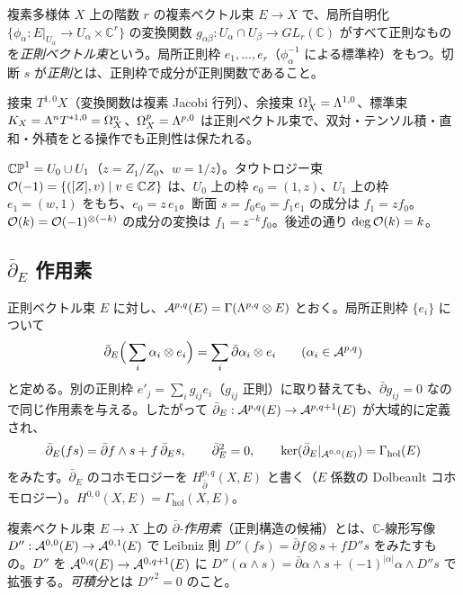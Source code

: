 \begin{defn}[正則ベクトル束]
複素多様体 $X$ 上の階数 $r$ の複素ベクトル束 $E\to X$ で、局所自明化 $\{\phi_\alpha:E|_{U_\alpha}\to U_\alpha\times\mathbb C^r\}$ の変換関数 $g_{\alpha\beta}:U_\alpha\cap U_\beta\to GL_r(\mathbb C)$ がすべて正則なものを\emph{正則ベクトル束}という。局所正則枠 $e_1,\dots,e_r$（$\phi_\alpha^{-1}$ による標準枠）をもつ。切断 $s$ が\emph{正則}とは、正則枠で成分が正則関数であること。
\end{defn}
接束 $T^{1,0}X$（変換関数は複素 Jacobi 行列）、余接束 $\Omega^1_X=\Lambda^{1,0}$、標準束 $K_X=\Lambda^nT^{*1,0}=\Omega^n_X$、$\Omega^p_X=\Lambda^{p,0}$ は正則ベクトル束で、双対・テンソル積・直和・外積をとる操作でも正則性は保たれる。

\begin{ex}[$\CP^1$ 上の直線束 $\Oc(k)$]\label{ex:Ok}
$\mathbb{CP}^1=U_0\cup U_1$（$z=Z_1/Z_0$、$w=1/z$）。タウトロジー束 $\mathcal O(-1)=\{([Z],v)\mid v\in\mathbb C Z\}$ は、$U_0$ 上の枠 $e_0=(1,z)$、$U_1$ 上の枠 $e_1=(w,1)$ をもち、$e_0=z\,e_1$。断面 $s=f_0e_0=f_1e_1$ の成分は $f_1=zf_0$。$\mathcal O(k)=\mathcal O(-1)^{\otimes(-k)}$ の成分の変換は $f_1=z^{-k}f_0$。後述の通り $\deg\mathcal O(k)=k$。
\end{ex}

\subsection{$\bar\partial_E$ 作用素}
正則ベクトル束 $E$ に対し、$\mathcal A^{p,q}(E)=\Gamma(\Lambda^{p,q}\otimes E)$ とおく。局所正則枠 $\{e_i\}$ について
\[
\bar\partial_E\Big(\sum_i\alpha_i\otimes e_i\Big)=\sum_i\bar\partial\alpha_i\otimes e_i\qquad(\alpha_i\in\mathcal A^{p,q})
\]
と定める。別の正則枠 $e'_j=\sum_ig_{ij}e_i$（$g_{ij}$ 正則）に取り替えても、$\bar\partial g_{ij}=0$ なので同じ作用素を与える。したがって $\bar\partial_E:\mathcal A^{p,q}(E)\to\mathcal A^{p,q+1}(E)$ が大域的に定義され、
\begin{equation}\label{eq:dbarE}
\bar\partial_E(f s)=\bar\partial f\wedge s+f\,\bar\partial_Es,\qquad\bar\partial_E^2=0,\qquad \ker(\bar\partial_E|_{\mathcal A^{0,0}(E)})=\Gamma_{\mathrm{hol}}(E)
\end{equation}
をみたす。$\bar\partial_E$ のコホモロジーを $H^{p,q}_{\bar\partial}(X,E)$ と書く（$E$ 係数の Dolbeault コホモロジー）。$H^{0,0}(X,E)=\Gamma_{\mathrm{hol}}(X,E)$。

\begin{defn}
複素ベクトル束 $E\to X$ 上の \emph{$\bar\partial$-作用素}（正則構造の候補）とは、$\mathbb C$-線形写像 $D'':\mathcal A^{0,0}(E)\to\mathcal A^{0,1}(E)$ で Leibniz 則 $D''(fs)=\bar\partial f\otimes s+fD''s$ をみたすもの。$D''$ を $\mathcal A^{0,q}(E)\to\mathcal A^{0,q+1}(E)$ に $D''(\alpha\wedge s)=\bar\partial\alpha\wedge s+(-1)^{|\alpha|}\alpha\wedge D''s$ で拡張する。\emph{可積分}とは $D''^2=0$ のこと。
\end{defn}

